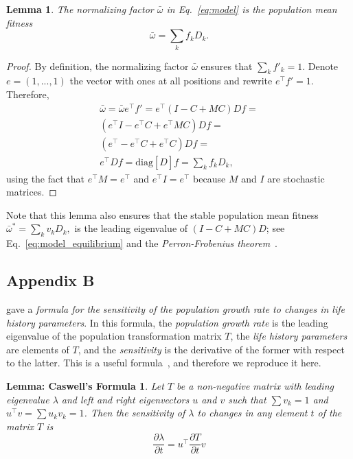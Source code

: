 \documentclass[9pt, a4paper, twocolumn]{extarticle}
\newcommand*{\tr}{^\intercal}
\newcommand{\matrx}[1]{{\left[ \stackrel{}{#1}\right]}}
\newcommand{\diag}[1]{\mbox{diag}\matrx{#1}}
\newtheorem*{lemma}{Lemma}
\newtheorem*{caswell}{Lemma: Caswell's Formula}
\begin{document}
\begin{lemma}
The normalizing factor $\bar{\omega}$ in Eq.~\ref{eq:model} is the population mean fitness
\begin{equation}
\bar{\omega} = \sum_k{f_k D_k}.
\end{equation}
\end{lemma}

\begin{proof}
By definition, the normalizing factor $\bar{\omega}$ ensures that $\sum_k{f'_k}=1$.
Denote $e = (1, ..., 1)$ the vector with ones at all positions and rewrite $e\tr f' = 1$.
Therefore, 
\begin{multline}\label{eq:mean_fitness}
\bar{\omega} = 
\bar{\omega} e\tr f' = 
e\tr (I - C + M C) D f = \\
(e\tr I - e\tr C + e\tr M C) D f = \\
(e\tr - e\tr C + e\tr C) D f = \\
e\tr D f = 
\diag{D} f = 
\sum_k{f_k D_k},
\end{multline}
using the fact that $e\tr M = e\tr$ and $e\tr I = e\tr$ because $M$ and $I$ are stochastic matrices.
\end{proof}

Note that this lemma also ensures that the stable population mean fitness $\bar{\omega}^*=\sum_k{v_k D_k},$ is the leading eigenvalue of $(I - C + M C) D$; see Eq.~\ref{eq:model_equilibrium} and the \emph{Perron-Frobenius theorem}~\cite[Appendix~A]{Otto2007}.

\subsection*{Appendix B}\label{sec:AppB}

\citet{Caswell1978} gave a \emph{formula for the sensitivity of the population growth rate to changes in life history parameters}.
In this formula, the \emph{population growth rate} is the leading eigenvalue of the population transformation matrix $T$, the \emph{life history parameters} are elements of $T$, and the \emph{sensitivity} is the derivative of the former with respect to the latter.
This is a useful formula~\citep{Caswell1978,Hermisson2002,Ram2012}, and therefore we reproduce it here.

\begin{caswell}
Let $T$ be a non-negative matrix with leading eigenvalue $\lambda$ and left and right eigenvectors $u$ and $v$ such that $\sum{v_k}=1$ and $u\tr v = \sum{u_k v_k} = 1$.
Then the sensitivity of $\lambda$ to changes in any element $t$ of the matrix $T$ is
\begin{equation}\label{eq:Caswells_formula}
\frac{\partial \lambda}{\partial t} = 
u\tr \frac{\partial T}{\partial t} v
\end{equation}
\end{caswell}
\end{document}
